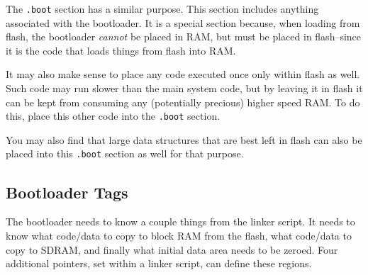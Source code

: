 \documentclass{gqtekspec}
\begin{document}
The {\tt .boot} section has a similar purpose.  This section includes anything
associated with the bootloader.  It is a special section because, when loading
from flash, the bootloader {\em cannot} be placed in RAM, but must be placed
in flash--since it is the code that loads things from flash into RAM.

It may also make sense to place any code executed once only within flash as
well.  Such code may run slower than the main system code, but by leaving it in
flash it can be kept from consuming any (potentially precious) higher speed
RAM.  To do this, place this other code into the {\tt .boot} section.

You may also find that large data structures that are best left in flash
can also be placed into this {\tt .boot} section as well for that purpose.
\subsection{Bootloader Tags}\label{sec:ld-boot}
The bootloader needs to know a couple things from the linker script.  It needs
to know what code/data to copy to block RAM from the flash, what code/data to
copy to SDRAM, and finally what initial data area needs to be zeroed.  Four
additional pointers, set within a linker script, can define these regions.
\end{document}
